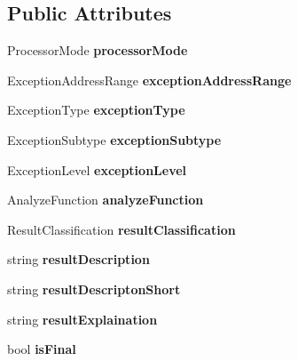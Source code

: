 \subsection*{Public Attributes}
\begin{DoxyCompactItemize}
\item 
\mbox{\label{classsl2_1_1_bang_rule_a5cb3354f3cbe990081d458b569e637d4}} 
Processor\+Mode {\bfseries processor\+Mode}
\item 
\mbox{\label{classsl2_1_1_bang_rule_a13a99a51fcf216efb76650283c9478a3}} 
Exception\+Address\+Range {\bfseries exception\+Address\+Range}
\item 
\mbox{\label{classsl2_1_1_bang_rule_a506837c2cac40febfa1034b2da89fd91}} 
Exception\+Type {\bfseries exception\+Type}
\item 
\mbox{\label{classsl2_1_1_bang_rule_a6a2bdef1e6e07b469c0a5f2914e5f024}} 
Exception\+Subtype {\bfseries exception\+Subtype}
\item 
\mbox{\label{classsl2_1_1_bang_rule_a0303c132846a54d62f207e94cccf3c1b}} 
Exception\+Level {\bfseries exception\+Level}
\item 
\mbox{\label{classsl2_1_1_bang_rule_adc650267874df4ca21d6d1cc8ad69308}} 
Analyze\+Function {\bfseries analyze\+Function}
\item 
\mbox{\label{classsl2_1_1_bang_rule_af46906f79766041d701a6f0e5559f069}} 
Result\+Classification {\bfseries result\+Classification}
\item 
\mbox{\label{classsl2_1_1_bang_rule_a3552158dc77cc22cedb95915e6cfbf9c}} 
string {\bfseries result\+Description}
\item 
\mbox{\label{classsl2_1_1_bang_rule_a38c189c73457e7335be49d7bd1fb9ba9}} 
string {\bfseries result\+Descripton\+Short}
\item 
\mbox{\label{classsl2_1_1_bang_rule_ad82b3d1113b8255b27c91ea4d002f24d}} 
string {\bfseries result\+Explaination}
\item 
\mbox{\label{classsl2_1_1_bang_rule_a622c4f8ba3a804cdf63d8b7e8499113a}} 
bool {\bfseries is\+Final}
\end{DoxyCompactItemize}
